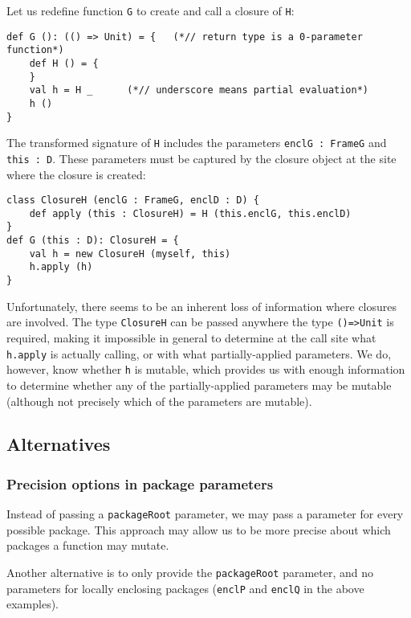 \documentclass[letterpaper,11pt]{article}
\newcommand{\code}[1]{\lstinline$#1$}
\begin{document}
Let us redefine function \code{G} to create and call a closure of \code{H}:

\begin{lstlisting}
def G (): (() => Unit) = {   (*// return type is a 0-parameter function*)
	def H () = {
	}
	val h = H _      (*// underscore means partial evaluation*)
	h ()
}
\end{lstlisting}

The transformed signature of \code{H} includes the parameters
\code{enclG : FrameG} and \code{this : D}.
These parameters must be captured by the closure object at the site
where the closure is created:

\begin{lstlisting}
class ClosureH (enclG : FrameG, enclD : D) {
	def apply (this : ClosureH) = H (this.enclG, this.enclD)
}
def G (this : D): ClosureH = {
	val h = new ClosureH (myself, this)
	h.apply (h)
}
\end{lstlisting}

Unfortunately, there seems to be an inherent loss of information
where closures are involved.
The type \code{ClosureH} can be passed anywhere
the type \code{()=>Unit} is required, making it impossible in general
to determine at the call site what \code{h.apply} is actually calling,
or with what partially-applied parameters.
We do, however, know whether \code{h} is mutable, which provides us with
enough information to determine whether any of the partially-applied parameters
may be mutable (although not precisely which of the parameters are mutable).

\subsection{Alternatives}

\subsubsection{Precision options in package parameters}

Instead of passing a \code{packageRoot} parameter,
we may pass a parameter for every possible package.
This approach may allow us to be more precise about which packages
a function may mutate.

Another alternative is to only provide the \code{packageRoot} parameter, and no
parameters for locally enclosing packages (\code{enclP} and \code{enclQ} in the above examples).
\end{document}

